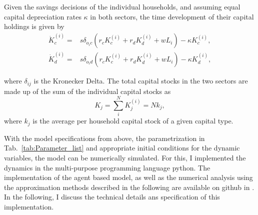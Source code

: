 Given the savings decisions of the individual households, and assuming equal capital depreciation rates $\kappa$ in both sectors, the time development of their capital holdings is given by
\begin{align}
  \dot{K}_c^{(i)} =& s\delta_{o_ic} \left( r_c K_c^{(i)} + r_d K_d^{(i)} + w L_i \right) - \kappa K_c^{(i)}, \label{eq:clean_investment}\\
  \dot{K}_d^{(i)} =& s\delta_{o_id} \left( r_c K_c^{(i)} + r_d K_d^{(i)} + w L_i \right) - \kappa K_d^{(i)}, \label{eq:dirty_investment}
\end{align}

where $\delta_{ij}$ is the Kronecker Delta. The total capital stocks in the two sectors are made up of the sum of the individual capital stocks as
\begin{equation}
K_j = \sum_i^N K_j^{(i)} = N k_j,
\end{equation}
where $k_j$ is the average per household capital stock of a given capital type.


With the model specifications from above, the parametrization in Tab.~\ref{tab:Parameter_list} and appropriate initial conditions for the dynamic variables, the model can be numerically simulated.
For this, I implemented the dynamics in the multi-purpose programming language python. The implementation of the agent based model, as well as the numerical analysis using the approximation methods described in the following are available on github in \cite{kolb2018}.
In the following, I discuss the technical details ans specification of this implementation.


